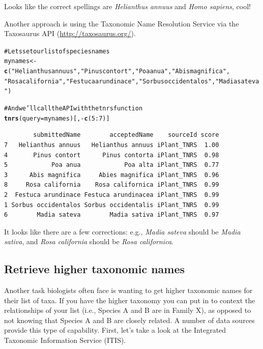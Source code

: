 \documentclass[letterpaper,superscriptaddress,showkeys,longbibliography]{revtex4-1}\usepackage{graphicx, color}
\makeatletter
\newcommand{\hlfunctioncall}[1]{\textcolor[rgb]{0.501960784313725,0,0.329411764705882}{\textbf{#1}}}%
\newcommand{\hlstring}[1]{\textcolor[rgb]{0.6,0.6,1}{#1}}%
\newcommand{\hlcomment}[1]{\textcolor[rgb]{0.180392156862745,0.6,0.341176470588235}{#1}}%
\newenvironment{kframe}{%
 \def\at@end@of@kframe{}%
 \ifinner\ifhmode%
  \def\at@end@of@kframe{\end{minipage}}%
  \begin{minipage}{\columnwidth}%
 \fi\fi%
 \def\FrameCommand##1{\hskip\@totalleftmargin \hskip-\fboxsep
 \colorbox{shadecolor}{##1}\hskip-\fboxsep
     \hskip-\linewidth \hskip-\@totalleftmargin \hskip\columnwidth}%
 \MakeFramed {\advance\hsize-\width
   \@totalleftmargin\z@ \linewidth\hsize
   \@setminipage}}%
 {\par\unskip\endMakeFramed%
 \at@end@of@kframe}
\newenvironment{knitrout}{}{} %
\makeatother
\begin{document}
Looks like the correct spellings are \emph{Helianthus annuus} and \emph{Homo sapiens}, cool!

Another approach is using the Taxonomic Name Resolution Service via the Taxosaurus API (\url{http://taxosaurus.org/}).

\begin{knitrout}
\color{fgcolor}\begin{kframe}
\begin{alltt}
\hlcomment{# Lets set our list of species names}
mynames <- \hlfunctioncall{c}(\hlstring{"Helianthus annuus"}, \hlstring{"Pinus contort"}, \hlstring{"Poa anua"}, \hlstring{"Abis magnifica"}, 
    \hlstring{"Rosa california"}, \hlstring{"Festuca arundinace"}, \hlstring{"Sorbus occidentalos"}, \hlstring{"Madia sateva"})

\hlcomment{# And we'll call the API with the tnrs function}
\hlfunctioncall{tnrs}(query = mynames)[, -\hlfunctioncall{c}(5:7)]
\end{alltt}
\begin{verbatim}
        submittedName        acceptedName    sourceId score
7   Helianthus annuus   Helianthus annuus iPlant_TNRS  1.00
4       Pinus contort      Pinus contorta iPlant_TNRS  0.98
5            Poa anua            Poa alta iPlant_TNRS  0.77
3      Abis magnifica     Abies magnifica iPlant_TNRS  0.96
8     Rosa california    Rosa californica iPlant_TNRS  0.99
2  Festuca arundinace Festuca arundinacea iPlant_TNRS  0.99
1 Sorbus occidentalos Sorbus occidentalis iPlant_TNRS  0.99
6        Madia sateva        Madia sativa iPlant_TNRS  0.97
\end{verbatim}
\end{kframe}
\end{knitrout}


It looks like there are a few corrections: e.g., \emph{Madia sateva} should be \emph{Madia sativa}, and \emph{Rosa california} should be \emph{Rosa californica}.

\subsection{Retrieve higher taxonomic names}

Another task biologists often face is wanting to get higher taxonomic names for their list of taxa. If you have the higher taxonomy you can put in to context the relationships of your list (i.e., Species A and B are in Family X), as opposed to not knowing that Species A and B are closely related. A number of data sources provide this type of capability. First, let's take a look at the Integrated Taxonomic Information Service (ITIS). 
\end{document}
